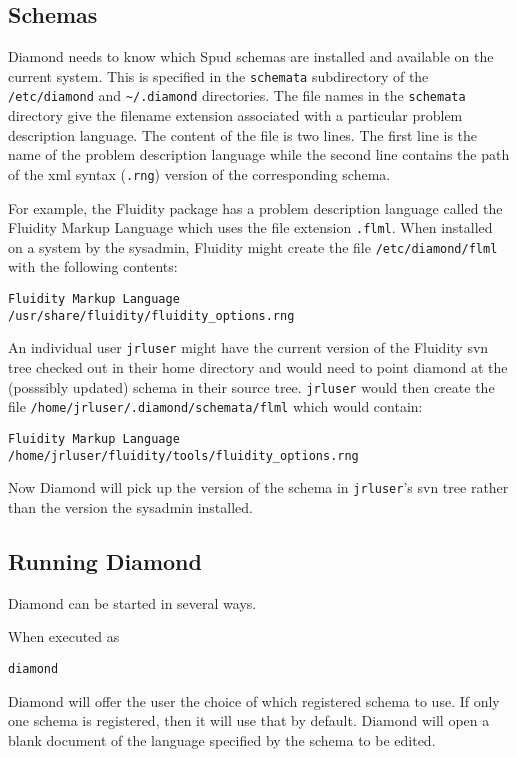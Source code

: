 \documentclass[a4paper, 11pt]{book}
\begin{document}
\subsection{Schemas}

Diamond needs to know which Spud schemas are installed and available on the
current system. This is specified in the \verb+schemata+ subdirectory of the
\verb+/etc/diamond+ and \verb+~/.diamond+ directories. The file names in the
\verb+schemata+ directory give the filename extension associated with a
particular problem description language. The content of the file is two
lines. The first line is the name of the problem description language while
the second line contains the path of the xml syntax (\verb+.rng+) version of
the corresponding schema. 

For example, the Fluidity package has a problem description language called
the Fluidity Markup Language which uses the file extension
\verb+.flml+. When installed on a system by the sysadmin, Fluidity might
create the file \verb+/etc/diamond/flml+ with the following contents:
\begin{verbatim}
Fluidity Markup Language
/usr/share/fluidity/fluidity_options.rng
\end{verbatim}
An individual user \verb+jrluser+ might have the current version of the
Fluidity svn tree checked out in their home directory and would need to
point diamond at the (posssibly updated) schema in their source
tree. \verb+jrluser+ would then create the file
\verb+/home/jrluser/.diamond/schemata/flml+ which would contain:
\begin{verbatim}
Fluidity Markup Language
/home/jrluser/fluidity/tools/fluidity_options.rng
\end{verbatim}
Now Diamond will pick up the version of the schema in \verb+jrluser+'s svn
tree rather than the version the sysadmin installed.

\subsection{Running Diamond}

Diamond can be started in several ways.

When executed as
\begin{verbatim}
diamond
\end{verbatim}
Diamond will offer the user the choice of which registered schema to use.
If only one schema is registered, then it will use that by default.
Diamond will open a blank document of the language specified by the schema to be edited.
\end{document}
